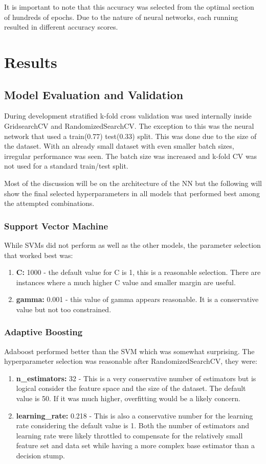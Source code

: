 \documentclass[11pt]{article}
\begin{document}
	It is important to note that this accuracy was selected from the optimal section of hundreds of epochs. Due to the nature of neural networks, each running resulted in different accuracy scores.
	
	\section{Results}
	\subsection{Model Evaluation and Validation}
	During development stratified k-fold cross validation was used internally inside GridsearchCV and RandomizedSearchCV. The exception to this was the neural network that used a train(0.77) test(0.33) split. This was done due to the size of the dataset. With an already small dataset with even smaller batch sizes, irregular performance was seen. The batch size was increased and k-fold CV was not used for a standard train/test split.
	
	Most of the discussion will be on the architecture of the NN but the following will show the final selected hyperparameters in all models that performed best among the attempted combinations.
	
	\subsubsection{Support Vector Machine}
	While SVMs did not perform as well as the other models, the parameter selection that worked best was:
	
	\begin{enumerate}
		\item \textbf{C:} 1000 - the default value for C is 1, this is a reasonable selection. There are instances where a much higher C value and smaller margin are useful.
		\item \textbf{gamma:} 0.001 - this value of gamma appears reasonable. It is a conservative value but not too constrained.
	\end{enumerate}
	
	\subsubsection{Adaptive Boosting}
	Adaboost performed better than the SVM which was somewhat surprising. The hyperparameter selection was reasonable after RandomizedSearchCV, they were:

	\begin{enumerate}
		\item \textbf{n\_estimators:} 32 - This is a very conservative number of estimators but is logical consider the feature space and the size of the dataset. The default value is 50. If it was much higher, overfitting would be a likely concern.
		\item \textbf{learning\_rate:} 0.218 - This is also a conservative number for the learning rate considering the default value is 1. Both the number of estimators and learning rate were likely throttled to compensate for the relatively small feature set and data set while having a more complex base estimator than a decision stump.
	\end{enumerate}
\end{document}
